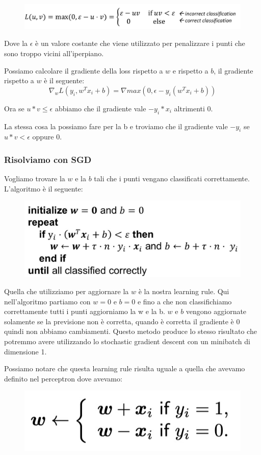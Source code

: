 \documentclass[14pt]{extreport}
\begin{document}
\begin{figure}[H]
\centering
\includegraphics[width=0.6\linewidth]{267.jpeg}
\end{figure}
 Dove la $\epsilon$ è un valore costante che viene utilizzato per penalizzare i punti che sono troppo vicini all'iperpiano.
 
 Possiamo calcolare il gradiente della loss rispetto a $w$ e rispetto a $b$, il gradiente rispetto a $w$ è il seguente: $$\nabla_w L(y_i, w^Tx_i+b) =
 \nabla max(0, \epsilon - y_i(w^Tx_i+b))$$

Ora se $u*v \leq \epsilon$ abbiamo che il gradiente vale $-y_i*x_i$ altrimenti 0.

La stessa cosa la possiamo fare per la b e troviamo che il gradiente vale $-y_i$ se $u*v<\epsilon$ oppure 0.


\subsubsection{Risolviamo con SGD}

Vogliamo trovare la $w$ e la $b$ tali che i punti vengano classificati correttamente. L'algoritmo è il seguente:

\begin{figure}[H]
\centering
\includegraphics[width=0.6\linewidth]{268.jpeg}
\end{figure}

Quella che utilizziamo per aggiornare la $w$ è la nostra learning rule. Qui nell'algoritmo partiamo con $w=0$ e $b=0$ e fino a che non classifichiamo
correttamente tutti i punti aggiorniamo la w e la b. $w$ e $b$ vengono aggiornate solamente se la previsione non è corretta, quando è corretta il
gradiente è 0 quindi non abbiamo cambiamenti. Questo metodo produce lo stesso risultato che potremmo avere utilizzando lo stochastic gradient descent
con un minibatch di dimensione 1.

Possiamo notare che questa learning rule risulta uguale a quella che avevamo definito nel perceptron dove avevamo:
\begin{figure}[H]
\centering
\includegraphics[width=0.7\linewidth]{269.jpeg}
\end{figure}
 
\end{document}
